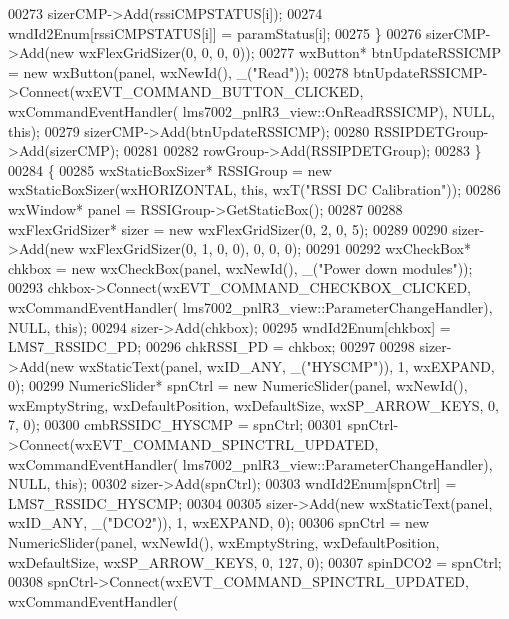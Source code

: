 \begin{DoxyCode}
{00273                 sizerCMP->Add(rssiCMPSTATUS[i]);
00274                 wndId2Enum[rssiCMPSTATUS[i]] = paramStatus[i];
00275             \}
00276             sizerCMP->Add(\textcolor{keyword}{new} wxFlexGridSizer(0, 0, 0, 0));
00277             wxButton* btnUpdateRSSICMP = \textcolor{keyword}{new} wxButton(panel, wxNewId(), \_(\textcolor{stringliteral}{"Read"}));
00278             btnUpdateRSSICMP->Connect(wxEVT\_COMMAND\_BUTTON\_CLICKED, wxCommandEventHandler(
      lms7002_pnlR3_view::OnReadRSSICMP), NULL, \textcolor{keyword}{this});
00279             sizerCMP->Add(btnUpdateRSSICMP);
00280             RSSIPDETGroup->Add(sizerCMP);
00281 
00282             rowGroup->Add(RSSIPDETGroup);
00283         \}
00284     \{
00285         wxStaticBoxSizer* RSSIGroup = \textcolor{keyword}{new} wxStaticBoxSizer(wxHORIZONTAL, \textcolor{keyword}{this}, wxT(\textcolor{stringliteral}{"RSSI DC Calibration"}));
00286         wxWindow* panel = RSSIGroup->GetStaticBox();
00287 
00288         wxFlexGridSizer* sizer = \textcolor{keyword}{new} wxFlexGridSizer(0, 2, 0, 5);
00289 
00290         sizer->Add(\textcolor{keyword}{new} wxFlexGridSizer(0, 1, 0, 0), 0, 0, 0);
00291 
00292         wxCheckBox* chkbox = \textcolor{keyword}{new} wxCheckBox(panel, wxNewId(), \_(\textcolor{stringliteral}{"Power down modules"}));
00293         chkbox->Connect(wxEVT\_COMMAND\_CHECKBOX\_CLICKED, wxCommandEventHandler(
      lms7002_pnlR3_view::ParameterChangeHandler), NULL, \textcolor{keyword}{this});
00294         sizer->Add(chkbox);
00295         wndId2Enum[chkbox] = LMS7_RSSIDC_PD;
00296         chkRSSI_PD = chkbox;
00297 
00298         sizer->Add(\textcolor{keyword}{new} wxStaticText(panel, wxID\_ANY, \_(\textcolor{stringliteral}{"HYSCMP"})), 1, wxEXPAND, 0);
00299         NumericSlider* spnCtrl = \textcolor{keyword}{new} NumericSlider(panel, wxNewId(), wxEmptyString, wxDefaultPosition, 
      wxDefaultSize, wxSP\_ARROW\_KEYS, 0, 7, 0);
00300         cmbRSSIDC_HYSCMP = spnCtrl;
00301         spnCtrl->Connect(wxEVT\_COMMAND\_SPINCTRL\_UPDATED, wxCommandEventHandler(
      lms7002_pnlR3_view::ParameterChangeHandler), NULL, \textcolor{keyword}{this});
00302         sizer->Add(spnCtrl);
00303         wndId2Enum[spnCtrl] = LMS7_RSSIDC_HYSCMP;
00304 
00305         sizer->Add(\textcolor{keyword}{new} wxStaticText(panel, wxID\_ANY, \_(\textcolor{stringliteral}{"DCO2"})), 1, wxEXPAND, 0);
00306         spnCtrl = \textcolor{keyword}{new} NumericSlider(panel, wxNewId(), wxEmptyString, wxDefaultPosition, wxDefaultSize, 
      wxSP\_ARROW\_KEYS, 0, 127, 0);
00307         spinDCO2 = spnCtrl;
00308         spnCtrl->Connect(wxEVT\_COMMAND\_SPINCTRL\_UPDATED, wxCommandEventHandler(
}
\end{DoxyCode}
